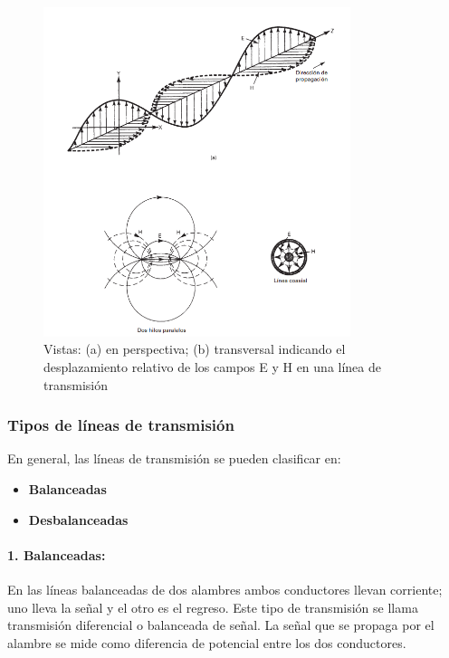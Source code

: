        
            \begin{figure}[H]
                \centering
                \includegraphics[width=0.8\textwidth]{imagenes/ondas_emt.png}
                \caption{Vistas: (a) en perspectiva; (b) transversal indicando el desplazamiento relativo de los campos E y H en una línea de transmisión}
                \label{fig:ondas_emt}
            \end{figure}

        \subsubsection{Tipos de líneas de transmisión}

            En general, las líneas de transmisión se pueden clasificar en:

            \begin{itemize}
                \item \textbf{Balanceadas}
                \item \textbf{Desbalanceadas}
            \end{itemize}

            \paragraph{1. Balanceadas:}

            En las líneas balanceadas de dos alambres ambos conductores llevan corriente; uno lleva la señal y el otro es el regreso. Este tipo de transmisión se llama transmisión diferencial o balanceada de señal. La señal que se propaga por el alambre se mide como diferencia de potencial entre los dos conductores.

